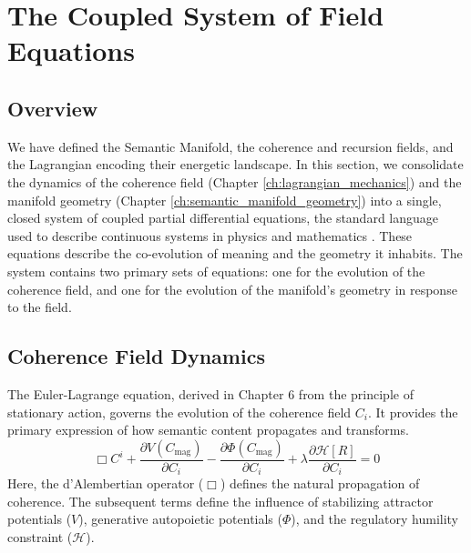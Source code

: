\chapter{The Coupled System of Field Equations}
\label{ch:the_coupled_system_of_field_equations}


\section{Overview}

We have defined the Semantic Manifold, the coherence and recursion fields, and the Lagrangian encoding their energetic landscape. In this section, we consolidate the dynamics of the coherence field (Chapter \ref{ch:lagrangian_mechanics}) and the manifold geometry (Chapter \ref{ch:semantic_manifold_geometry}) into a single, closed system of coupled partial differential equations, the standard language used to describe continuous systems in physics and mathematics \autocite{Evans2010}. These equations describe the co-evolution of meaning and the geometry it inhabits. The system contains two primary sets of equations: one for the evolution of the coherence field, and one for the evolution of the manifold's geometry in response to the field.


\section{Coherence Field Dynamics}
\label{sec:coherence_field_dynamics}

The Euler-Lagrange equation, derived in Chapter 6 from the principle of stationary action, governs the evolution of the coherence field \(C_i\). It provides the primary expression of how semantic content propagates and transforms.
\begin{equation}
\Box C^i + \frac{\partial V(C_{\mathrm{mag}})}{\partial C_i} - \frac{\partial \Phi(C_{\mathrm{mag}})}{\partial C_i} + \lambda \frac{\partial \mathcal{H}[R]}{\partial C_i} = 0
\end{equation}
Here, the d'Alembertian operator (\(\Box\)) defines the natural propagation of coherence. The subsequent terms define the influence of stabilizing attractor potentials (\(V\)), generative autopoietic potentials (\(\Phi\)), and the regulatory humility constraint (\(\mathcal{H}\)).


